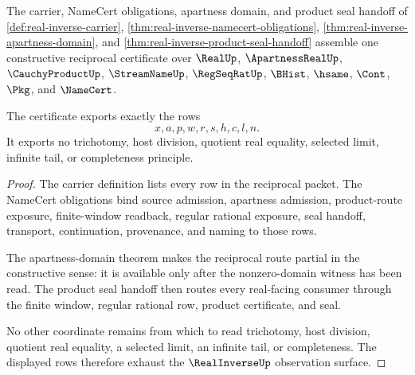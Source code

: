\begin{theorem}
\label{thm:real-inverse-non-escape}
The carrier, NameCert obligations, apartness domain, and product seal handoff of \autoref{def:real-inverse-carrier}, \autoref{thm:real-inverse-namecert-obligations}, \autoref{thm:real-inverse-apartness-domain}, and \autoref{thm:real-inverse-product-seal-handoff} assemble one constructive reciprocal certificate over $\RealUp$, $\ApartnessRealUp$, $\CauchyProductUp$, $\StreamNameUp$, $\RegSeqRatUp$, $\BHist$, $\hsame$, $\Cont$, $\Pkg$, and $\NameCert$.

The certificate exports exactly the rows
$$
x,a,p,w,r,s,h,c,l,n.
$$
It exports no trichotomy, host division, quotient real equality, selected limit, infinite tail, or completeness principle.
\end{theorem}
\begin{proof}
The carrier definition lists every row in the reciprocal packet. The NameCert obligations bind source admission, apartness admission, product-route exposure, finite-window readback, regular rational exposure, seal handoff, transport, continuation, provenance, and naming to those rows.

The apartness-domain theorem makes the reciprocal route partial in the constructive sense: it is available only after the nonzero-domain witness has been read. The product seal handoff then routes every real-facing consumer through the finite window, regular rational row, product certificate, and seal.

No other coordinate remains from which to read trichotomy, host division, quotient real equality, a selected limit, an infinite tail, or completeness. The displayed rows therefore exhaust the $\RealInverseUp$ observation surface.
\end{proof}

